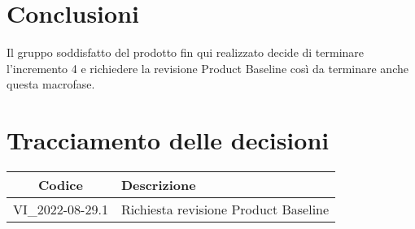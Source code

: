 \section{Conclusioni}
Il gruppo soddisfatto del prodotto fin qui realizzato decide di terminare l'incremento 4 e richiedere la revisione Product Baseline così da terminare anche questa macrofase.
\newpage

\section*{Tracciamento delle decisioni}
	\renewcommand{\arraystretch}{1.8} %
	\begin{tabular}{ |c|l| }
		\hline
		\textbf{Codice} & \textbf{Descrizione} \\
		\hline
		VI\_2022-08-29.1 & Richiesta revisione Product Baseline\\ %
		\hline
	\end{tabular}